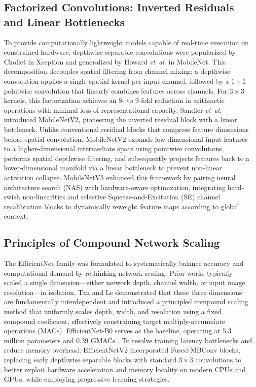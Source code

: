 \subsection{Factorized Convolutions: Inverted Residuals and Linear Bottlenecks}
To provide computationally lightweight models capable of real-time execution on constrained hardware, depthwise separable convolutions were popularized by Chollet \cite{13} in Xception and generalized by Howard \emph{et~al.} \cite{11} in MobileNet. This decomposition decouples spatial filtering from channel mixing: a depthwise convolution applies a single spatial kernel per input channel, followed by a $1\times1$ pointwise convolution that linearly combines features across channels. For $3\times3$ kernels, this factorization achieves an 8- to 9-fold reduction in arithmetic operations with minimal loss of representational capacity. Sandler \emph{et~al.} \cite{27} introduced MobileNetV2, pioneering the inverted residual block with a linear bottleneck. Unlike conventional residual blocks that compress feature dimensions before spatial convolution, MobileNetV2 expands low-dimensional input features to a higher-dimensional intermediate space using pointwise convolutions, performs spatial depthwise filtering, and subsequently projects features back to a lower-dimensional manifold via a linear bottleneck to prevent non-linear activation collapse. MobileNetV3 \cite{14} enhanced this framework by pairing neural architecture search (NAS) \cite{36} with hardware-aware optimization, integrating hard-swish non-linearities and selective Squeeze-and-Excitation (SE) channel recalibration blocks \cite{12} to dynamically reweight feature maps according to global context.

\subsection{Principles of Compound Network Scaling}
The EfficientNet family \cite{30} was formulated to systematically balance accuracy and computational demand by rethinking network scaling. Prior works typically scaled a single dimension---either network depth, channel width, or input image resolution---in isolation. Tan and Le demonstrated that these three dimensions are fundamentally interdependent and introduced a principled compound scaling method that uniformly scales depth, width, and resolution using a fixed compound coefficient, effectively constraining target multiply-accumulate operations (MACs). EfficientNet-B0 serves as the baseline, operating at 5.3 million parameters and 0.39 GMACs \cite{30}. To resolve training latency bottlenecks and reduce memory overhead, EfficientNetV2 \cite{31} incorporated Fused-MBConv blocks, replacing early depthwise separable blocks with standard $3\times3$ convolutions to better exploit hardware acceleration and memory locality on modern CPUs and GPUs, while employing progressive learning strategies.


